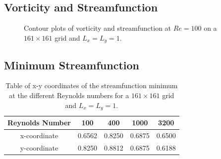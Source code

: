 \documentclass[11pt]{article}
\begin{document}
	\subsection{Vorticity and Streamfunction}
	\begin{figure}[htp]
            \centering
            \hfill
            \caption{Contour plots of vorticity and streamfunction at $Re=100$ on a $161 \times 161$ grid and $L_x = L_y = 1$.}
            \label{fig:contours}
        \end{figure}			
	\newpage
	
	\subsection{Minimum Streamfunction}
	\begin{table}[htb]
    	\centering
    	\begin{tabular}{ c | c c c c }
    	\toprule
    	Reynolds Number & 100 & 400 & 1000 & 3200 \\
    	\midrule
		x-coordinate & 0.6562 & 0.8250 & 0.6875 & 0.6500 \\
		y-coordinate & 0.8250 & 0.8812 & 0.6875 & 0.6188  \\
        \bottomrule
        \end{tabular}
        \vspace{0.5em}
        \label{tab:stress}
    	\caption{Table of x-y coordinates of the streamfunction minimum at the different Reynolds numbers for a $161 \times 161$ grid and $L_x = L_y = 1$.}	
	\end{table}
\end{document}
